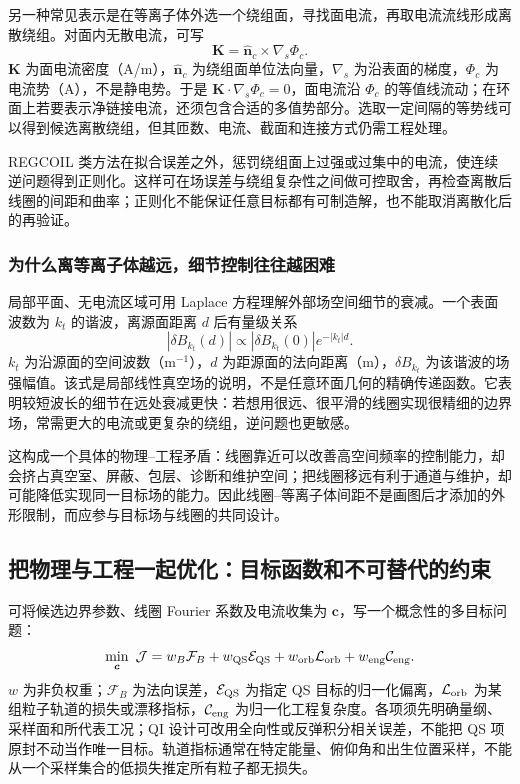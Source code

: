 \documentclass[12pt,fontset=none]{ctexart}
\numberwithin{equation}{section}
\numberwithin{table}{section}
\numberwithin{figure}{section}
\begin{document}
另一种常见表示是在等离子体外选一个绕组面，寻找面电流，再取电流流线形成离散绕组。对面内无散电流，可写
\begin{equation}\label{eq:stellarator-current-potential}
 \bm K=\hat{\bm n}_c\times\nabla_s\Phi_c.
\end{equation}
$\bm K$ 为面电流密度（A/m），$\hat{\bm n}_c$ 为绕组面单位法向量，$\nabla_s$ 为沿表面的梯度，$\Phi_c$ 为电流势（A），不是静电势。于是 $\bm K\cdot\nabla_s\Phi_c=0$，面电流沿 $\Phi_c$ 的等值线流动；在环面上若要表示净链接电流，还须包含合适的多值势部分。选取一定间隔的等势线可以得到候选离散绕组，但其匝数、电流、截面和连接方式仍需工程处理。

REGCOIL 类方法在拟合误差之外，惩罚绕组面上过强或过集中的电流，使连续逆问题得到正则化。这样可在场误差与绕组复杂性之间做可控取舍，再检查离散后线圈的间距和曲率；正则化不能保证任意目标都有可制造解，也不能取消离散化后的再验证\cite{Sregcoil}。

\subsubsection{为什么离等离子体越远，细节控制往往越困难}

局部平面、无电流区域可用 Laplace 方程理解外部场空间细节的衰减。一个表面波数为 $k_t$ 的谐波，离源面距离 $d$ 后有量级关系
\begin{equation}\label{eq:stellarator-distance}
 |\delta B_{k_t}(d)|\propto|\delta B_{k_t}(0)|e^{-|k_t|d}.
\end{equation}
$k_t$ 为沿源面的空间波数（$\mathrm{m^{-1}}$），$d$ 为距源面的法向距离（m），$\delta B_{k_t}$ 为该谐波的场强幅值。该式是局部线性真空场的说明，不是任意环面几何的精确传递函数。它表明较短波长的细节在远处衰减更快：若想用很远、很平滑的线圈实现很精细的边界场，常需更大的电流或更复杂的绕组，逆问题也更敏感。

这构成一个具体的物理--工程矛盾：线圈靠近可以改善高空间频率的控制能力，却会挤占真空室、屏蔽、包层、诊断和维护空间；把线圈移远有利于通道与维护，却可能降低实现同一目标场的能力。因此线圈--等离子体间距不是画图后才添加的外形限制，而应参与目标场与线圈的共同设计。

\subsection{把物理与工程一起优化：目标函数和不可替代的约束}\label{sec:stellarator-optimization}

可将候选边界参数、线圈 Fourier 系数及电流收集为 $\bm c$，写一个概念性的多目标问题：
\begin{equation}\label{eq:stellarator-objective}
 \min_{\bm c}\ \mathcal J
 =w_B\mathcal F_B+w_{\rm QS}\mathcal E_{\rm QS}
 +w_{\rm orb}\mathcal L_{\rm orb}+w_{\rm eng}\mathcal C_{\rm eng}.
\end{equation}
$w$ 为非负权重；$\mathcal F_B$ 为法向误差，$\mathcal E_{\rm QS}$ 为指定 QS 目标的归一化偏离，$\mathcal L_{\rm orb}$ 为某组粒子轨道的损失或漂移指标，$\mathcal C_{\rm eng}$ 为归一化工程复杂度。各项须先明确量纲、采样面和所代表工况；QI 设计可改用全向性或反弹积分相关误差，不能把 QS 项原封不动当作唯一目标。轨道指标通常在特定能量、俯仰角和出生位置采样，不能从一个采样集合的低损失推定所有粒子都无损失。
\end{document}
